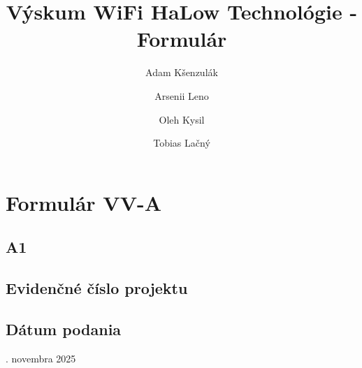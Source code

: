\documentclass[11pt]{article}
\title{ \bf Výskum WiFi HaLow Technológie - Formulár}
\author{Adam Kšenzulák\and Arsenii Leno\and Oleh Kysil\and Tobias Lačný}
\date{}
\begin{document}
\maketitle


\section{\bf Formulár VV-A}

\subsection*{\bf A1}
\subsection{Evidenčné číslo projektu}
\subsection{Dátum podania}
. novembra 2025
\end{document}
